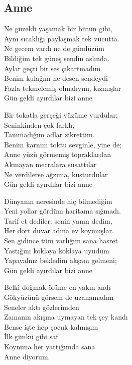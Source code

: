 \subsection{Anne}

Ne güzeldi yaşamak bir bütün gibi, \\
Aynı sıcaklığı paylaşmak tek vücutta. \\
Ne gecem vardı ne de gündüzüm \\
Bildiğim tek güneş sendin aslında. \\
Aylar geçti bir ses çıkartmadım \\
Benim kulağım ne desen sendeydi \\
Fazla tekmelemiş olmalıyım, kızmışlar \\
Gün geldi ayırdılar bizi anne

\noindent\newline
Bir tokatla gerçeği yüzüme vurdular; \\
Seninkinden çok farklı, \\
Tanımadığım adlar zikrettim. \\
Benim karnım toktu sevginle, yine de; \\
Anne yüzü görmemiş topraklardan \\
Akmayan mecralara susattılar \\
Ne verdilerse ağzıma, kusturdular \\
Gün geldi ayırdılar bizi anne

\noindent\newline
Dünyanın neresinde hiç bilmediğim \\
Yeni yollar gördüm haritama sığmadı. \\
Tarif et dediler; senin yanın dedim, \\
Her dört duvar adına ev koymuşlar. \\
Sen gidince tüm varlığım sana hasret \\
Yastığını koklaya koklaya uyudum \\
Yapayalnız bekledim akşam gelmeni; \\
Gün geldi ayırdılar bizi anne

\noindent\newline
Belki doğmak ölüme en yakın andı \\
Gökyüzünü görsem de uzanamadım \\
Seneler aktı gözlerimden \\
Zamanın akışına uymayan tek şey kandı \\
Bense işte hep çocuk kalmışım \\
İlk günkü gibi saf \\
Koynuna her yattığımda sana \\
Anne diyorum.